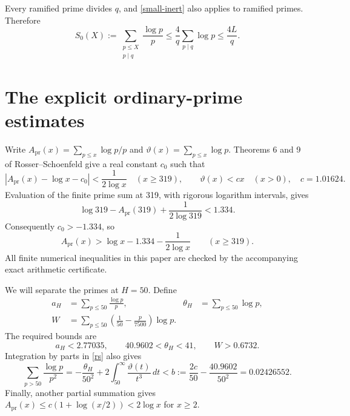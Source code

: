 \documentclass[11pt]{article}
\begin{document}
Every ramified prime divides \(q\), and \eqref{small-inert} also
applies to ramified primes. Therefore
\begin{equation}\label{ramified}
 S_0(X):=\sum_{\substack{p\le X\\p\mid q}}\frac{\log p}{p}
 \le\frac4q\sum_{p\mid q}\log p\le\frac{4L}{q}.
\end{equation}

\section{The explicit ordinary-prime estimates}\label{primes}

Write
\(A_{\mathrm{pr}}(x)=\sum_{p\le x}\log p/p\) and
\(\vartheta(x)=\sum_{p\le x}\log p\).
Theorems 6 and 9 of Rosser--Schoenfeld \cite{rs} give a real constant
\(c_0\) such that
\begin{equation}\label{rs}
 |A_{\mathrm{pr}}(x)-\log x-c_0|<\frac1{2\log x}\quad(x\ge319),
 \qquad
 \vartheta(x)<cx\quad(x>0),\quad c=1.01624.
\end{equation}
Evaluation of the finite prime sum at 319, with rigorous logarithm
intervals, gives
\[
 \log319-A_{\mathrm{pr}}(319)+\frac1{2\log319}<1.334.
\]
Consequently \(c_0>-1.334\), so
\begin{equation}\label{prime-total}
 A_{\mathrm{pr}}(x)>\log x-1.334-\frac1{2\log x}\qquad(x\ge319).
\end{equation}
All finite numerical inequalities in this paper are checked by the
accompanying exact arithmetic certificate.

We will separate the primes at \(H=50\). Define
\begin{align*}
 a_H&=\sum_{p\le50}\frac{\log p}{p},&
 \theta_H&=\sum_{p\le50}\log p,\\
 W&=\sum_{p\le50}\left(\frac1{50}-\frac{p}{7500}\right)\log p.
\end{align*}
The required bounds are
\begin{equation}\label{small-constants}
 a_H<2.77035,\qquad40.9602<\theta_H<41,\qquad W>0.6732.
\end{equation}
Integration by parts in \eqref{rs} also gives
\begin{equation}\label{prime-tail}
 \sum_{p>50}\frac{\log p}{p^2}
 =-\frac{\theta_H}{50^2}
   +2\int_{50}^\infty\frac{\vartheta(t)}{t^3}\,dt
 < b:=\frac{2c}{50}-\frac{40.9602}{50^2}=0.02426552.
\end{equation}
Finally, another partial summation gives
\(A_{\mathrm{pr}}(x)\le c(1+\log(x/2))<2\log x\) for \(x\ge2\).
\end{document}
